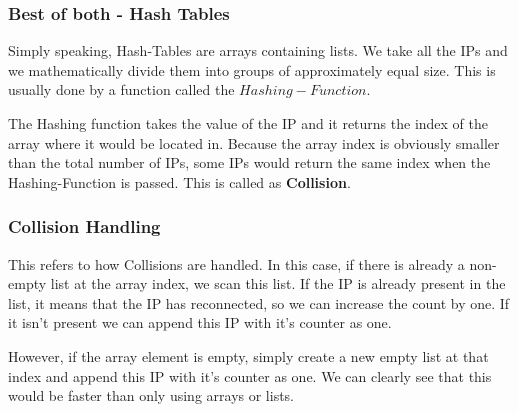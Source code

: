 \documentclass{article}
\theoremstyle{definition}
\theoremstyle{example}
\begin{document}
\subsubsection{\Large Best of both - Hash Tables}
\hspace{4mm} Simply speaking, Hash-Tables are arrays containing lists. We take all the IPs and we mathematically divide them into groups of approximately equal size. This is usually done by a function called the $Hashing-Function$.\par
\vspace{4mm}
The Hashing function takes the value of the IP and it returns the index of the array where it would be located in. Because the array index is obviously smaller than the total number of IPs, some IPs would return the same index when the Hashing-Function is passed. This is called as \textbf{Collision}.

\subsubsection{\Large Collision Handling}
\hspace{4mm} This refers to how Collisions are handled. In this case, if there is already a non-empty list at the array index, we scan this list. If the IP is already present in the list, it means that the IP has reconnected, so we can increase the count by one. If it isn't present we can append this IP with it's counter as one.\par
\vspace{4mm}
However, if the array element is empty, simply create a new empty list at that index and append this IP with it's counter as one. We can clearly see that this would be faster than only using arrays or lists.\par
\end{document}
